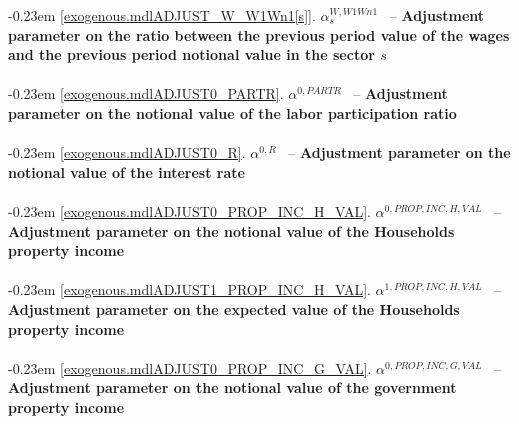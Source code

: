 \documentclass[12pt]{article}
\numberwithin{equation}{section}
\begin{document}
\noindent \kern-0.23em \noindent \begingroup {} \label{exogenous.mdlADJUST_W_W1Wn1[s]}\ref{exogenous.mdlADJUST_W_W1Wn1[s]}.
         
        \ensuremath{\alpha^{W,W1Wn1}_{s}}~ \endgroup -- \noindent \textbf{Adjustment parameter on the ratio between the previous period value of the wages and the previous period notional value in the sector $s$}  \\ \\[-8pt]


\noindent \kern-0.23em \noindent \begingroup {} \label{exogenous.mdlADJUST0_PARTR}\ref{exogenous.mdlADJUST0_PARTR}.
         
        \ensuremath{\alpha^{{0},PARTR}}~ \endgroup -- \noindent \textbf{Adjustment parameter on the notional value of the labor participation ratio}  \\ \\[-8pt]


\noindent \kern-0.23em \noindent \begingroup {} \label{exogenous.mdlADJUST0_R}\ref{exogenous.mdlADJUST0_R}.
         
        \ensuremath{\alpha^{{0},R}}~ \endgroup -- \noindent \textbf{Adjustment parameter on the notional value of the interest rate}  \\ \\[-8pt]


\noindent \kern-0.23em \noindent \begingroup {} \label{exogenous.mdlADJUST0_PROP_INC_H_VAL}\ref{exogenous.mdlADJUST0_PROP_INC_H_VAL}.
         
        \ensuremath{\alpha^{{0},PROP,INC,H,VAL}}~ \endgroup -- \noindent \textbf{Adjustment parameter on the notional value of the Households property income}  \\ \\[-8pt]


\noindent \kern-0.23em \noindent \begingroup {} \label{exogenous.mdlADJUST1_PROP_INC_H_VAL}\ref{exogenous.mdlADJUST1_PROP_INC_H_VAL}.
         
        \ensuremath{\alpha^{{1},PROP,INC,H,VAL}}~ \endgroup -- \noindent \textbf{Adjustment parameter on the expected value of the Households property income}  \\ \\[-8pt]


\noindent \kern-0.23em \noindent \begingroup {} \label{exogenous.mdlADJUST0_PROP_INC_G_VAL}\ref{exogenous.mdlADJUST0_PROP_INC_G_VAL}.
         
        \ensuremath{\alpha^{{0},PROP,INC,G,VAL}}~ \endgroup -- \noindent \textbf{Adjustment parameter on the notional value of the government property income}  \\ \\[-8pt]
\end{document}
